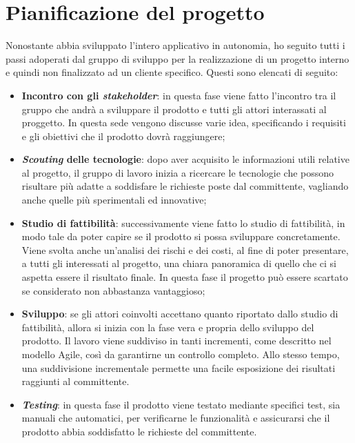 \section{Pianificazione del progetto}
Nonostante abbia sviluppato l'intero applicativo in autonomia, ho seguito tutti i passi adoperati dal gruppo di sviluppo per la realizzazione
di un progetto interno e quindi non finalizzato ad un cliente specifico.
Questi sono elencati di seguito:
\begin{itemize}
    \item \textbf{Incontro con gli \emph{stakeholder}}: in questa fase viene fatto l’incontro tra il gruppo che andrà a sviluppare il prodotto e tutti 
    gli attori interassati al proggetto. In questa sede vengono discusse varie idea, specificando i requisiti e gli obiettivi che il prodotto dovrà 
    raggiungere;
    \item \textbf{\emph{Scouting} delle tecnologie}: dopo aver acquisito le informazioni utili relative al progetto, il gruppo di lavoro inizia a ricercare 
    le tecnologie che possono risultare più adatte a soddisfare le richieste poste dal committente, vagliando anche quelle più sperimentali ed innovative;
    \item \textbf{Studio di fattibilità}: successivamente viene fatto lo studio di fattibilità, in modo tale da poter capire se il prodotto si possa sviluppare 
    concretamente. Viene svolta anche un’analisi dei rischi e dei costi, al fine di poter presentare, a tutti gli interessati al progetto, una chiara panoramica
    di quello che ci si aspetta essere il risultato finale. In questa fase il progetto può essere scartato se considerato non abbastanza vantaggioso;
    \item \textbf{Sviluppo}: se gli attori coinvolti accettano quanto riportato dallo studio di fattibilità, allora si inizia con la fase vera 
    e propria dello sviluppo del prodotto. 
    Il lavoro viene suddiviso in tanti incrementi, come descritto nel modello Agile, così da garantirne un controllo completo. Allo stesso tempo,
    una suddivisione incrementale permette una facile esposizione dei risultati raggiunti al committente.
    \item \textbf{\emph{Testing}}: in questa fase il prodotto viene testato mediante specifici test, sia manuali che automatici, per verificarne le 
    funzionalità e assicurarsi che il prodotto abbia soddisfatto le richieste del committente.
\end{itemize}
